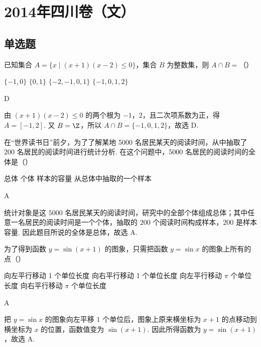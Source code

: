 \chapter{2014年四川卷（文）}

\section{单选题}

\begin{problem}
已知集合 \(A = \{x \mid (x + 1)(x - 2) \leqslant 0\}\)，集合 \(B\) 为整数集，则 \(A \cap B =\)（\quad）

\choices
    {\( \{-1,0\} \)}
    {\(\{0, 1\}\)}
    {\(\{-2, -1, 0, 1\}\)}
    {\(\{-1, 0, 1, 2\}\)}
\begin{answer}
D
\end{answer}

\begin{solution}
由 \((x+1)(x-2)\leqslant0\) 的两个根为 \(-1\)，\(2\)，且二次项系数为正，得 \(A=[-1,2]\). 又 \(B=\Z\)，所以 \(A\cap B=\{-1,0,1,2\}\)，故选 D.
\end{solution}
\end{problem}

\begin{problem}
在“世界读书日”前夕，为了了解某地 5000 名居民某天的阅读时间，从中抽取了 200 名居民的阅读时间进行统计分析. 在这个问题中，5000 名居民的阅读时间的全体是（\quad）

\choices
    {总体}
    {个体}
    {样本的容量}
    {从总体中抽取的一个样本}
\begin{answer}
A
\end{answer}

\begin{solution}
统计对象是这 \(5000\) 名居民某天的阅读时间，研究中的全部个体组成总体；其中任意一名居民的阅读时间是一个个体，抽取的 \(200\) 个阅读时间构成样本，\(200\) 是样本容量. 因此题目所说的全体是总体，故选 A.
\end{solution}
\end{problem}

\begin{problem}
为了得到函数 \(y = \sin (x + 1)\) 的图象，只需把函数 \(y = \sin x\) 的图象上所有的点（\quad）

\choices
    {向左平行移动 1 个单位长度}
    {向右平行移动 1 个单位长度}
    {向左平行移动 \(\pi\) 个单位长度}
    {向右平行移动 \(\pi\) 个单位长度}
\begin{answer}
A
\end{answer}

\begin{solution}
把 \(y=\sin x\) 的图象向左平移 \(1\) 个单位后，图象上原来横坐标为 \(x+1\) 的点移动到横坐标为 \(x\) 的位置，函数值变为 \(\sin(x+1)\). 因此所得函数为 \(y=\sin(x+1)\)，故选 A.
\end{solution}
\end{problem}

